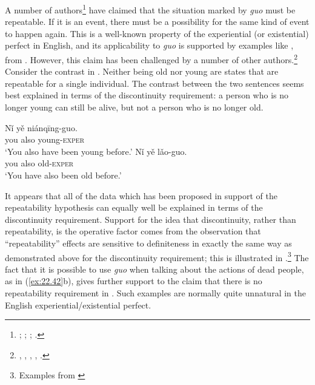 A number of authors\footnote{\citet{Ma1977}; \citet[230]{LiThompson1981}; \citet{Yeh1996}; \citet[268]{Smith1997}.} have claimed that the situation marked by \textit{guo} must be repeatable. If it is an event, there must be a possibility for the same kind of event to happen again. This is a well-known property of the experiential (or existential) perfect in English, and its applicability to \textit{guo} is supported by examples like , from \citet[15]{Ma1977}. However, this claim has been challenged by a number of other authors.\footnote{\citet{Chen1979}, \citet{Iljic1990}, \citet[147--148]{XiaoMcEnery2004},  \citet{PanLee2004}, \citet{Lin2007}.} Consider the contrast in . Neither being old nor young are states that are repeatable for a single individual. The contrast between the two sentences seems best explained in terms of the discontinuity requirement: a person who is no longer young can still be alive, but not a person who is no longer old.


\z

\ea \label{ex:22.41}
\ea  \gll Nǐ  yě  niánqīng-guo.\\
you  also  young-\textsc{exper}\\
\glt ‘You also have been young before.’ 
\ex \gll *Nǐ  yě  lǎo-guo.\\
you  also  old-\textsc{exper}\\
\glt ‘You have also been old before.’
\z \z


It appears that all of the data which has been proposed in support of the repeatability hypothesis can equally well be explained in terms of the discontinuity requirement. Support for the idea that discontinuity, rather than repeatability, is the operative factor comes from the observation that “repeatability” effects are sensitive to definiteness in exactly the same way as demonstrated above for the discontinuity requirement; this is illustrated in .\footnote{Examples from \citet[153, 163]{Yeh1996}} The fact that it is possible to use \textit{guo} when talking about the actions of dead people, as in (\ref{ex:22.42}b), gives further support to the claim that there is no repeatability requirement in . Such examples are normally quite unnatural in the English experiential/existential perfect.


